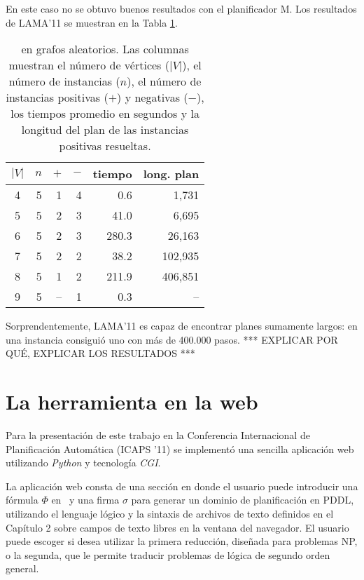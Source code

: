 En este caso no se obtuvo buenos resultados con el planificador M.
Los resultados de LAMA'11 \cite{richter:lama} se muestran en la
Tabla \ref{table:exp:co-3col}.

\begin{table}[h!]
\centering
\begin{tabular}{crrrrr}
$|V|$ & $n$ & $+$ & $-$ &  tiempo & long. plan  \\
\midrule
    4 &   5 &   1 &   4 &   0.6 &   1,731  \\
    5 &   5 &   2 &   3 &  41.0 &   6,695  \\
    6 &   5 &   2 &   3 & 280.3 &  26,163  \\
    7 &   5 &   2 &   2 &  38.2 & 102,935  \\
    8 &   5 &   1 &   2 & 211.9 & 406,851  \\
    9 &   5 & -- &   1 &   0.3 &      -- \\
\end{tabular}
\caption[Resultados de LAMA'11 para \coCOL]{\small \coCOL en grafos aleatorios.
  Las columnas muestran el número de vértices ($|V|$), el número de instancias ($n$),
  el número de instancias positivas ($+$) y negativas ($-$), los tiempos
  promedio en segundos y la longitud del plan de las instancias positivas
  resueltas.
}
\label{table:exp:co-3col}
\end{table}

Sorprendentemente, LAMA'11 es capaz de encontrar planes sumamente largos: en
una instancia consiguió uno con más de 400.000 pasos.
*** EXPLICAR POR QUÉ, EXPLICAR LOS RESULTADOS ***

\section{La herramienta en la web}

Para la presentación de este trabajo en la Conferencia Internacional de
Planificación Automática (ICAPS '11) se implementó una sencilla aplicación web
utilizando \textit{Python} y tecnología \textit{CGI}.


La aplicación web consta de una sección en donde el usuario puede introducir
una fórmula $\Phi$ en \LSO\ y una firma $\sigma$ para generar un dominio de
planificación en PDDL, utilizando el lenguaje lógico y la
sintaxis de archivos de texto definidos en el Capítulo 2 sobre campos de texto
libres en la ventana del navegador.
El usuario puede escoger si desea utilizar la primera reducción, diseñada para
problemas NP, o la segunda, que le permite traducir problemas de lógica de
segundo orden general.

